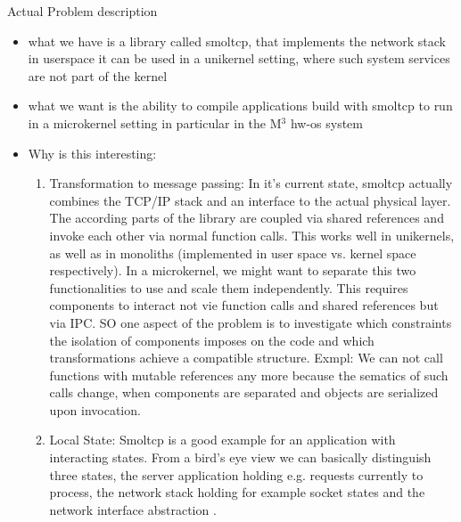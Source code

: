 Actual Problem description
\begin{itemize}
    \item what we have is a library called smoltcp, that implements the network stack in userspace \means it can be used in a unikernel setting, where such system services are not part of the kernel
    \item what we want is the ability to compile applications build with smoltcp to run in a microkernel setting in particular in the M$^3$ hw-os system
    \item Why is this interesting:
    \begin{enumerate}
        \item Transformation to message passing: In it's current state, smoltcp actually combines the TCP/IP stack and an interface to the actual physical layer. The according parts of the library are coupled via shared references and invoke each other via normal function calls. This works well in unikernels, as well as in monoliths (implemented in user space vs. kernel space respectively). In a microkernel, we might want to separate this two functionalities to use and scale them independently. This requires components to interact not vie function calls and shared references but via IPC. SO one aspect of the problem is to investigate which constraints the isolation of components imposes on the code and which transformations achieve a compatible structure. Exmpl: We can not call functions with mutable references any more because the sematics of such calls change, when components are separated and objects are serialized upon invocation.
        \item Local State: Smoltcp is a good example for an application with interacting states. From a bird's eye view we can basically distinguish three states, the server application holding e.g. requests currently to process, the network stack holding for example socket states and the network interface abstraction . 
        

\end{enumerate}
\end{itemize}
